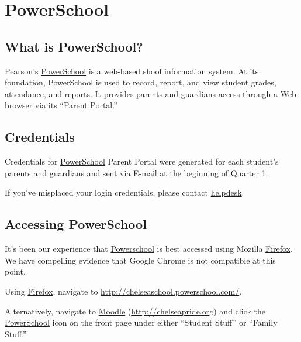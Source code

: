 \documentclass[letterpaper,10pt,english]{sphinxmanual}
\begin{document}

\chapter{PowerSchool}
\label{powerschool::doc}\label{powerschool:powerschool}\label{powerschool:index-0}

\section{What is PowerSchool?}
\label{powerschool:what-is-powerschool}
Pearson's \href{http://chelseaschool.powerschool.com/}{PowerSchool} is a web-based shool information system. At its foundation, PowerSchool is used to record, report, and view student grades, attendance, and reports. It provides parents and guardians access through a Web browser via its ``Parent Portal.''


\section{Credentials}
\label{powerschool:credentials}
Credentials for \href{http://chelseaschool.powerschool.com/}{PowerSchool} Parent Portal were generated for each student's parents and guardians and sent via E-mail at the beginning of Quarter 1.

If you've misplaced your login credentials, please contact \href{http://chelseapride.org/helpdesk}{helpdesk}.


\section{Accessing PowerSchool}
\label{powerschool:accessing-powerschool}
It's been our experience that \href{http://chelseaschool.powerschool.com/}{Powerschool} is best accessed using Mozilla \href{http://www.mozilla.org/en-US/firefox/new/}{Firefox}. We have compelling evidence that Google Chrome is not compatible at this point.

Using \href{http://www.mozilla.org/en-US/firefox/new/}{Firefox}, navigate to \href{http://chelseaschool.powerschool.com/}{http://chelseaschool.powerschool.com/}.

Alternatively, navigate to \href{http://chelseapride.org}{Moodle} (\href{http://chelseapride.org}{http://chelseapride.org}) and click the \href{http://chelseaschool.powerschool.com/}{PowerSchool} icon on the front page under either ``Student Stuff'' or ``Family Stuff.''
\end{document}
